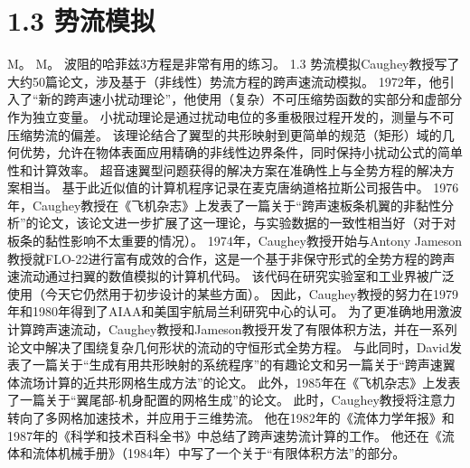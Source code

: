 \documentclass[UTF8,11pt,a4paper,openany,fontset=fandol]{ctexbook}
\begin{document}
\section{1.3 势流模拟}
M。 M。 波阻的哈菲兹3方程是非常有用的练习。 1.3 势流模拟Caughey教授写了大约50篇论文，涉及基于（非线性）势流方程的跨声速流动模拟。 1972年，他引入了“新的跨声速小扰动理论”，他使用（复杂）不可压缩势函数的实部分和虚部分作为独立变量。 小扰动理论是通过扰动电位的多重极限过程开发的，测量与不可压缩势流的偏差。 该理论结合了翼型的共形映射到更简单的规范（矩形）域的几何优势，允许在物体表面应用精确的非线性边界条件，同时保持小扰动公式的简单性和计算效率。 超音速翼型问题获得的解决方案在准确性上与全势方程的解决方案相当。 基于此近似值的计算机程序记录在麦克唐纳道格拉斯公司报告中。 1976年，Caughey教授在《飞机杂志》上发表了一篇关于“跨声速板条机翼的非黏性分析”的论文，该论文进一步扩展了这一理论，与实验数据的一致性相当好（对于对板条的黏性影响不太重要的情况）。 1974年，Caughey教授开始与Antony Jameson教授就FLO-22进行富有成效的合作，这是一个基于非保守形式的全势方程的跨声速流动通过扫翼的数值模拟的计算机代码。 该代码在研究实验室和工业界被广泛使用（今天它仍然用于初步设计的某些方面）。 因此，Caughey教授的努力在1979年和1980年得到了AIAA和美国宇航局兰利研究中心的认可。 为了更准确地用激波计算跨声速流动，Caughey教授和Jameson教授开发了有限体积方法，并在一系列论文中解决了围绕复杂几何形状的流动的守恒形式全势方程。 与此同时，David发表了一篇关于“生成有用共形映射的系统程序”的有趣论文和另一篇关于“跨声速翼体流场计算的近共形网格生成方法”的论文。 此外，1985年在《飞机杂志》上发表了一篇关于“翼尾部-机身配置的网格生成”的论文。 此时，Caughey教授将注意力转向了多网格加速技术，并应用于三维势流。 他在1982年的《流体力学年报》和1987年的《科学和技术百科全书》中总结了跨声速势流计算的工作。 他还在《流体和流体机械手册》（1984年）中写了一个关于“有限体积方法”的部分。
\end{document}

